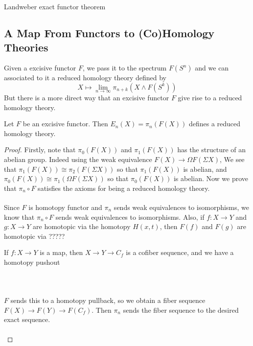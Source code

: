 \documentclass[a4paper]{article}
\begin{document}
\begin{thm}{Landweber exact functor theorem}{}
\end{thm}

\subsection{A Map From Functors to (Co)Homology Theories}
Given a excisive functor $F$, we pass it to the spectrum $F(S^n)$ and we can associated to it a reduced homology theory defined by $$X\mapsto\lim_{n\to\infty}\pi_{n+k}(X\wedge F(S^k))$$ But there is a more direct way that an excisive functor $F$ give rise to a reduced homology theory. 

\begin{thm}{}{} Let $F$ be an excisive functor. Then $E_n(X)=\pi_n(F(X))$ defines a reduced homology theory. \tcbline
\begin{proof}
Firstly, note that $\pi_0(F(X))$ and $\pi_1(F(X))$ has the structure of an abelian group. Indeed using the weak equivalence $F(X)\to\Omega F(\Sigma X)$, We see that $\pi_1(F(X))\cong\pi_2(F(\Sigma X))$ so that $\pi_1(F(X))$ is abelian, and $\pi_0(F(X))\cong\pi_1(\Omega F(\Sigma X))$ so that $\pi_0(F(X))$ is abelian. Now we prove that $\pi_n\circ F$ satisfies the axioms for being a reduced homology theory. \\~\\

Since $F$ is homotopy functor and $\pi_n$ sends weak equivalences to isomorphisms, we know that $\pi_n\circ F$ sends weak equivalences to isomorphisms. Also, if $f:X\to Y$ and $g:X\to Y$ are homotopic via the homotopy $H(x,t)$, then $F(f)$ and $F(g)$ are homotopic via ?????

If $f:X\to Y$ is a map, then $X\to Y\to C_f$ is a cofiber sequence, and we have a homotopy pushout \\~\\
\\~\\
$F$ sends this to a homotopy pullback, so we obtain a fiber sequence $F(X)\to F(Y)\to F(C_f)$. Then $\pi_n$ sends the fiber sequence to the desired exact sequence. \\~\\


\end{proof}
\end{thm}
\end{document}
